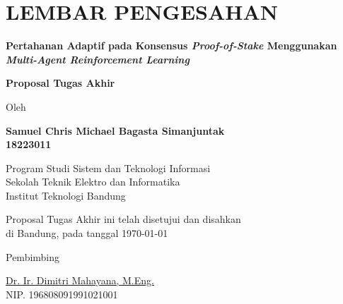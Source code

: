 \chapter*{LEMBAR PENGESAHAN}

\begin{center}
{\singlespacing

  \vspace{0.5cm}

  {\Large\bfseries Pertahanan Adaptif pada Konsensus \textit{Proof-of-Stake} Menggunakan \textit{Multi-Agent Reinforcement Learning}\par}

  \vspace{1cm}

  {\Large \textbf{Proposal Tugas Akhir}}\par

  \vspace{1cm}

  {\large Oleh}\par
  \vspace{0.3cm}
  \textbf{
    {\large Samuel Chris Michael Bagasta Simanjuntak}\\[0.1cm]
    {\large 18223011}
  }\par

  \vspace{0.8cm}

  {\large Program Studi Sistem dan Teknologi Informasi}\\
  {\large Sekolah Teknik Elektro dan Informatika}\\
  {\large Institut Teknologi Bandung}\par

  \vspace{1cm}

  Proposal Tugas Akhir ini telah disetujui dan disahkan\\
  di Bandung, pada tanggal \today\par

  \vspace{0.8cm}

  Pembimbing\par

  \vspace{2.2cm}

  \underline{Dr. Ir. Dimitri Mahayana, M.Eng.}\\[0.1cm]
  NIP. 196808091991021001\par

}
\end{center}